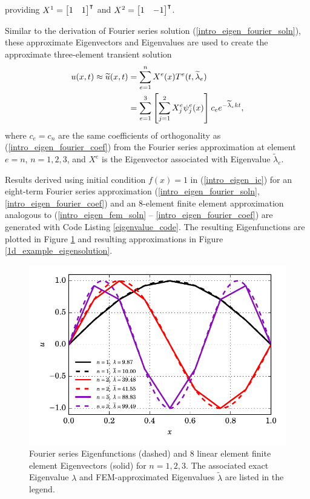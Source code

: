 providing $X^1 = \begin{bmatrix} 1 & 1 \end{bmatrix}^\intercal$ and $X^2 = \begin{bmatrix} 1 & -1 \end{bmatrix}^\intercal$.

Similar to the derivation of Fourier series solution (\ref{intro_eigen_fourier_soln}), these approximate Eigenvectors and Eigenvalues are used to create the approximate three-element transient solution
\begin{align}
  u(x,t) \approx \widetilde{u}(x,t) &= \sum_{e=1}^n X^e(x) T^e(t, \widetilde{\lambda}_e) \notag \\
  \label{intro_eigen_fem_soln}
  &= \sum_{e=1}^3 \left[ \sum_{j=1}^2 X^e_j \psi_j^e(x) \right] c_e e^{-\widetilde{\lambda}_e k t},
\end{align}
where $c_e = c_n$ are the same coefficients of orthogonality as (\ref{intro_eigen_fourier_coef}) from the Fourier series approximation at element $e = n$, $n=1,2,3$, and $X^e$ is the Eigenvector associated with Eigenvalue $\widetilde{\lambda}_e$.

Results derived using initial condition $f(x) = 1$ in (\ref{intro_eigen_ic}) for an eight-term Fourier series approximation (\ref{intro_eigen_fourier_soln}, \ref{intro_eigen_fourier_coef}) and an 8-element finite element approximation analogous to (\ref{intro_eigen_fem_soln} -- \ref{intro_eigen_fourier_coef}) are generated with Code Listing \ref{eigenvalue_code}.  The resulting Eigenfunctions are plotted in Figure \ref{1d_example_eigenvectors} and resulting approximations in Figure \ref{1d_example_eigensolution}.


\begin{figure}
  \centering
    \includegraphics[width=0.7\linewidth]{images/fenics_intro/eigenvectors.pdf}
  \caption[Eigenvector example solution]{Fourier series Eigenfunctions (dashed) and 8 linear element finite element Eigenvectors (solid) for $n=1,2,3$.  The associated exact Eigenvalue $\lambda$ and FEM-approximated Eigenvalues $\tilde{\lambda}$ are listed in the legend.}
  \label{1d_example_eigenvectors}
\end{figure}

